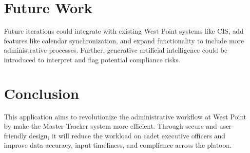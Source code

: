 \documentclass [11pt]{article}
\begin{document}
\section{Future Work}
Future iterations could integrate with existing West Point systems like CIS, add features like calendar synchronization, and expand functionality to include more administrative processes. Further, generative artificial intelligence could be introduced to interpret and flag potential compliance risks. 

\section{Conclusion}
This application aims to revolutionize the administrative workflow at West Point by make the Master Tracker system more efficient. Through secure and user-friendly design, it will reduce the workload on cadet executive officers and improve data accuracy, input timeliness, and compliance across the platoon.




\break

\end{document}
